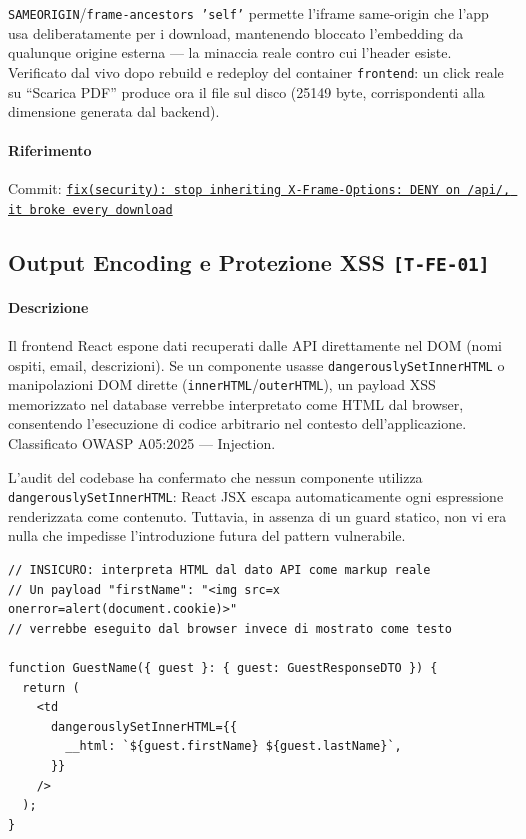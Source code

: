 ﻿\documentclass[a4paper,12pt]{report}
\newcommand{\commitref}[2]{\texttt{\small \href{https://github.com/diegoandruccioli/hotel-pms/commit/#1}{#2}}}
\newcommand{\threat}[1]{\texttt{\small\textcolor{vulnred}{[#1]}}}
\begin{document}
\texttt{SAMEORIGIN}/\texttt{frame-ancestors 'self'} permette l'iframe same-origin
che l'app usa deliberatamente per i download, mantenendo bloccato l'embedding da
qualunque origine esterna --- la minaccia reale contro cui l'header esiste.
Verificato dal vivo dopo rebuild e redeploy del container \texttt{frontend}: un
click reale su ``Scarica PDF'' produce ora il file sul disco (25149 byte,
corrispondenti alla dimensione generata dal backend).

\paragraph{Riferimento} Commit: \commitref{41bedde}{fix(security): stop inheriting X-Frame-Options: DENY on /api/, it broke every download}


\subsection{Output Encoding e Protezione XSS \threat{T-FE-01}}

\paragraph{Descrizione}
Il frontend React espone dati recuperati dalle API direttamente nel DOM (nomi ospiti,
email, descrizioni). Se un componente usasse \texttt{dangerouslySetInnerHTML} o
manipolazioni DOM dirette (\texttt{innerHTML}/\texttt{outerHTML}), un payload XSS
memorizzato nel database verrebbe interpretato come HTML dal browser, consentendo
l'esecuzione di codice arbitrario nel contesto dell'applicazione.
Classificato OWASP A05:2025 --- Injection.

L'audit del codebase ha confermato che nessun componente utilizza
\texttt{dangerously\-Set\-Inner\-HTML}: React JSX escapa automaticamente ogni espressione
renderizzata come contenuto. Tuttavia, in assenza di un guard statico, non vi era
nulla che impedisse l'introduzione futura del pattern vulnerabile.

\begin{insecurebox}[title={Vettore XSS: dangerouslySetInnerHTML con dato da API}]
\begin{lstlisting}[style=typescript]
// INSICURO: interpreta HTML dal dato API come markup reale
// Un payload "firstName": "<img src=x onerror=alert(document.cookie)>"
// verrebbe eseguito dal browser invece di mostrato come testo

function GuestName({ guest }: { guest: GuestResponseDTO }) {
  return (
    <td
      dangerouslySetInnerHTML={{
        __html: `${guest.firstName} ${guest.lastName}`,
      }}
    />
  );
}
\end{lstlisting}
\end{insecurebox}
\end{document}
